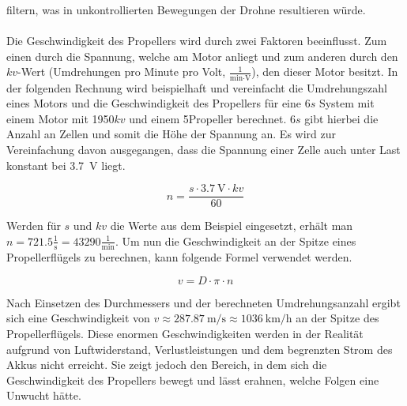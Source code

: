         filtern, was in unkontrollierten Bewegungen der Drohne resultieren würde. \\
        \\
        Die Geschwindigkeit des Propellers wird durch zwei Faktoren beeinflusst. Zum einen durch die Spannung,
        welche am Motor anliegt und zum anderen durch den $kv$-Wert (Umdrehungen pro Minute pro Volt,
        $\frac{1}{\si{\minute}\cdot \si{\volt}}$), den dieser Motor besitzt. In der folgenden Rechnung wird
        beispielhaft und vereinfacht die Umdrehungszahl eines Motors und die Geschwindigkeit des Propellers
        für eine 6$s$ System mit einem Motor mit 1950$kv$ und einem 5\dq Propeller berechnet. 6$s$ gibt hierbei
        die Anzahl an Zellen und somit die Höhe der Spannung an. Es wird zur Vereinfachung davon ausgegangen,
        dass die Spannung einer Zelle auch unter Last konstant bei \qty{3,7}{\volt} liegt.
    
        \begin{equation}
            n=\frac{s\cdot\qty{3,7}{\volt}\cdot kv}{60}
        \end{equation}

        Werden für $s$ und $kv$ die Werte aus dem Beispiel eingesetzt, erhält man
        $n=\num{721,5} \frac{1}{\si{\second}} = \num{43290} \frac{1}{\si{\minute}}$. Um nun die Geschwindigkeit
        an der Spitze eines Propellerflügels zu berechnen, kann folgende Formel verwendet werden.
        
        \begin{equation}
            v=D\cdot \pi \cdot n
        \end{equation}

        Nach Einsetzen des Durchmessers und der berechneten Umdrehungsanzahl ergibt sich eine Geschwindigkeit
        von $v\approx \qty{287,87}{\meter\per\second} \approx \qty{1036}{\kilo\meter\per\hour}$ an der Spitze
        des Propellerflügels. Diese enormen Geschwindigkeiten werden in der Realität aufgrund von Luftwiderstand,
        Verlustleistungen und dem begrenzten Strom des Akkus nicht erreicht. Sie zeigt jedoch den Bereich, in dem
        sich die Geschwindigkeit des Propellers bewegt und lässt erahnen, welche Folgen eine Unwucht hätte.